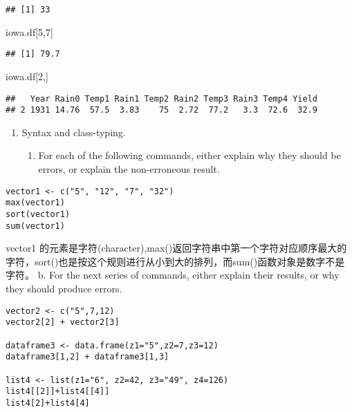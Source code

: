 \documentclass[hyperref,]{ctexart}
\newenvironment{Shaded}{\begin{snugshade}}{\end{snugshade}}
\newcommand{\DecValTok}[1]{\textcolor[rgb]{0.00,0.00,0.81}{#1}}
\newcommand{\NormalTok}[1]{#1}
\providecommand{\tightlist}{%
  \setlength{\itemsep}{0pt}\setlength{\parskip}{0pt}}
\begin{document}
\begin{verbatim}
## [1] 33
\end{verbatim}

\begin{Shaded}
\begin{Highlighting}[]
\NormalTok{iowa.df[}\DecValTok{5}\NormalTok{,}\DecValTok{7}\NormalTok{]}
\end{Highlighting}
\end{Shaded}

\begin{verbatim}
## [1] 79.7
\end{verbatim}

\begin{Shaded}
\begin{Highlighting}[]
\NormalTok{iowa.df[}\DecValTok{2}\NormalTok{,]}
\end{Highlighting}
\end{Shaded}

\begin{verbatim}
##   Year Rain0 Temp1 Rain1 Temp2 Rain2 Temp3 Rain3 Temp4 Yield
## 2 1931 14.76  57.5  3.83    75  2.72  77.2   3.3  72.6  32.9
\end{verbatim}

\begin{enumerate}
\def\labelenumi{\arabic{enumi}.}
\setcounter{enumi}{1}
\tightlist
\item
  Syntax and class-typing.

  \begin{enumerate}
  \def\labelenumii{\alph{enumii}.}
  \tightlist
  \item
    For each of the following commands, either explain why they should
    be errors, or explain the non-erroneous result.
  \end{enumerate}
\end{enumerate}

\begin{verbatim}
vector1 <- c("5", "12", "7", "32")
max(vector1)
sort(vector1)
sum(vector1)
\end{verbatim}

vector1
的元素是字符(character),max()返回字符串中第一个字符对应顺序最大的字符，sort()也是按这个规则进行从小到大的排列，而sum()函数对象是数字不是字符。
b. For the next series of commands, either explain their results, or why
they should produce errors.

\begin{verbatim}
vector2 <- c("5",7,12)
vector2[2] + vector2[3]

dataframe3 <- data.frame(z1="5",z2=7,z3=12)
dataframe3[1,2] + dataframe3[1,3]

list4 <- list(z1="6", z2=42, z3="49", z4=126)
list4[[2]]+list4[[4]]
list4[2]+list4[4]
\end{verbatim}
\end{document}
